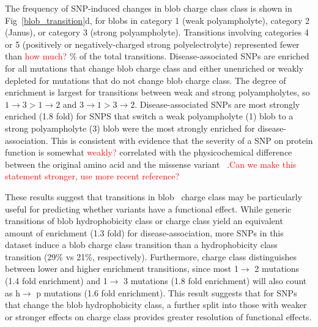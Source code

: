 \documentclass[10pt,letterpaper]{article}
\newcommand{\hydrochar}{hydrophobicity class}
\newcommand{\chargechar}{charge class}
\newcommand{\grace}[1]{\textcolor{red}{#1}}
\begin{document}
The frequency of SNP-induced changes in blob \chargechar{} class is shown in Fig~\ref{blob_transition}d, for blobs in category 1 (weak polyampholyte), category 2 (Janus), or category 3 (strong polyampholyte). 
Transitions involving categories 4 or 5 (positively or negatively-charged strong polyelectrolyte) represented fewer than \grace{how much?} \% of the total transitions. Disease-associated SNPs are enriched for all mutations that change blob \chargechar{} and either unenriched or weakly depleted for mutations that do not change blob \chargechar. The degree of enrichment is largest for transitions between weak and strong polyampholytes, 
so $1\rightarrow 3> 1 \rightarrow 2$ and $3\rightarrow 1 > 3\rightarrow 2$. Disease-associated SNPs are most strongly enriched (1.8 fold) for SNPS that switch a weak polyampholyte (1) blob to a strong polyampholyte (3) blob were the most strongly enriched for disease-association. This is consistent with evidence that the severity of a SNP on protein function is somewhat \grace{weakly?} correlated with the physicochemical difference between the original amino acid and the missense variant ~\cite{Stone2005}.\grace{Can we make this statement stronger, use more recent reference?}  %

These results suggest that transitions in blob ~\chargechar{} may be particularly useful for predicting whether variants have a functional effect.
While generic transitions of blob \hydrochar{} or \chargechar{} yield an equivalent amount of enrichment (1.3 fold) for disease-association, more SNPs in this dataset induce a blob \chargechar{} transition than a \hydrochar{} transition (29\% vs 21\%, respectively). Furthermore, \chargechar{} distinguishes between lower and higher enrichment transitions, since most 1$\rightarrow$ 2 mutations (1.4 fold enrichment) and 1$\rightarrow$ 3 mutations (1.8 fold enrichment) will also count as h$\rightarrow$ p mutations (1.6 fold enrichment). %
This result suggests that for SNPs that change the blob \hydrochar{}, a further split into those with weaker or stronger effects on \chargechar{} provides greater resolution of functional effects. 
\end{document}
